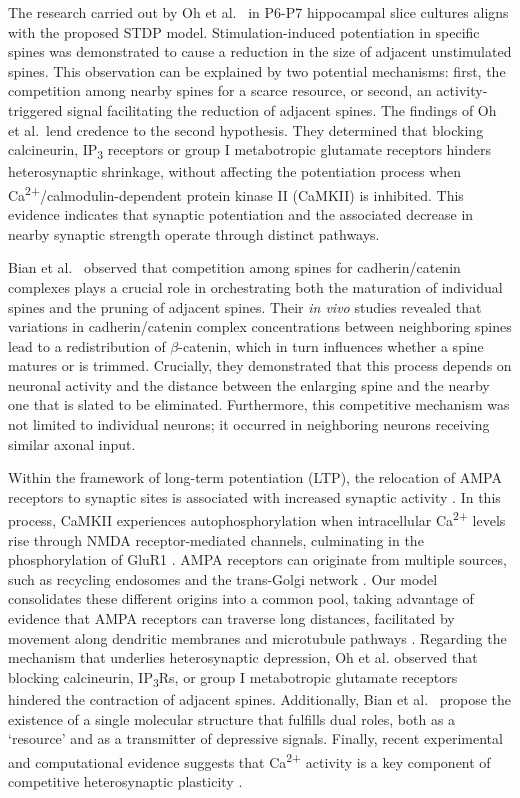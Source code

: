 \documentclass[utf8]{FrontiersinHarvard} %
\begin{document}
The research carried out by Oh et al.~\citeyearpar{Oh.2015} in P6-P7 hippocampal slice cultures aligns with the proposed STDP model. Stimulation-induced potentiation in specific spines was demonstrated to cause a reduction in the size of adjacent unstimulated spines. This observation can be explained by two potential mechanisms: first, the competition among nearby spines for a scarce resource, or second, an activity-triggered signal facilitating the reduction of adjacent spines. The findings of Oh et al.~lend credence to the second hypothesis. They determined that blocking calcineurin, IP\textsubscript{3} receptors or group I metabotropic glutamate receptors hinders heterosynaptic shrinkage, without affecting the potentiation process when Ca\textsuperscript{2+}/calmodulin-dependent protein kinase II (CaMKII) is inhibited. This evidence indicates that synaptic potentiation and the associated decrease in nearby synaptic strength operate through distinct pathways.

Bian et al.~\citeyearpar{Bian.2015} observed that competition among spines for cadherin/catenin complexes plays a crucial role in orchestrating both the maturation of individual spines and the pruning of adjacent spines. Their \textit{in vivo} studies revealed that variations in cadherin/catenin complex concentrations between neighboring spines lead to a redistribution of $\beta$-catenin, which in turn influences whether a spine matures or is trimmed. Crucially, they demonstrated that this process depends on neuronal activity and the distance between the enlarging spine and the nearby one that is slated to be eliminated. Furthermore, this competitive mechanism was not limited to individual neurons; it occurred in neighboring neurons receiving similar axonal input.

Within the framework of long-term potentiation (LTP), the relocation of AMPA receptors to synaptic sites is associated with increased synaptic activity \citep{Hayashi.2000,Sutton.2006u4b,Shi.2001}. In this process, CaMKII experiences autophosphorylation when intracellular Ca\textsuperscript{2+} levels rise through NMDA receptor-mediated channels, culminating in the phosphorylation of GluR1 \citep{Roche.1996}. AMPA receptors can originate from multiple sources, such as recycling endosomes \citep{Park.2004} and the trans-Golgi network \citep{Horton.2004}. Our model consolidates these different origins into a common pool, taking advantage of evidence that AMPA receptors can traverse long distances, facilitated by movement along dendritic membranes \citep{Choquet.2003} and microtubule pathways \citep{Washbourne.2002}. Regarding the mechanism that underlies heterosynaptic depression, Oh et al. \citeyearpar{Oh.2015} observed that blocking calcineurin, IP\textsubscript{3}Rs, or group I metabotropic glutamate receptors hindered the contraction of adjacent spines. Additionally, Bian et al.~\citeyearpar{Bian.2015} propose the existence of a single molecular structure that fulfills dual roles, both as a `resource' and as a transmitter of depressive signals. Finally, recent experimental and computational evidence suggests that Ca\textsuperscript{2+} activity is a key component of competitive heterosynaptic plasticity \citep{Chater.2024}.
\end{document}
